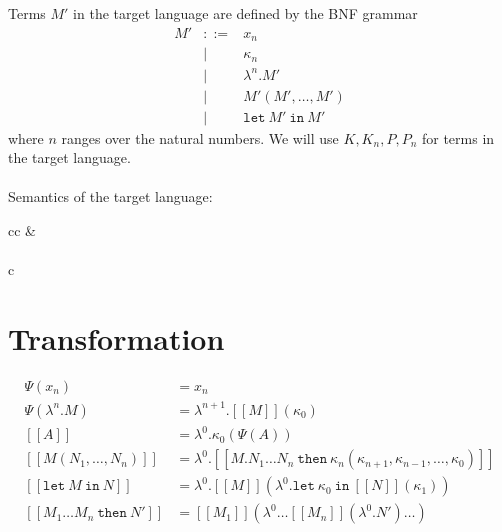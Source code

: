 \documentclass[a4paper,11pt]{article}
\begin{document}
Terms $M'$ in the target language are defined by the BNF grammar
\begin{eqnarray*}
M' & ::= & x_{n} \\
   &   | & \kappa_{n} \\
   &   | & \lambda^{n}.M' \\
   &   | & M'(M', \ldots, M') \\
   &   | & \texttt{let} \: M' \: \texttt{in} \: M'
\end{eqnarray*}
where $n$ ranges over the natural numbers.
We will use $K, K_{n}, P, P_{n}$ for terms in the target language.

\paragraph{}

Semantics of the target language:

\begin{center}

\begin{tabular}{cc}
 &
 \\
\end{tabular}

\paragraph{}

\begin{tabular}{c}
\end{tabular}

\end{center}


\section{Transformation}\label{sec:transformation}

\begin{align*}
\Psi(x_{n}) &=
  x_{n} \\
\Psi(\lambda^{n}.M) &=
  \lambda^{n+1}.[\![M]\!](\kappa_{0}) \\[1em]
[\![A]\!] &=
  \lambda^{0}.\kappa_{0} (\Psi(A)) \\
[\![M(N_{1}, \ldots, N_{n})]\!] &=
  \lambda^{0}.[\![M . N_{1} \ldots N_{n} \: \texttt{then} \:
  \kappa_{n}(\kappa_{n+1}, \kappa_{n-1}, \ldots, \kappa_{0})]\!] \\
[\![\texttt{let} \: M \: \texttt{in} \: N]\!] &=
  \lambda^{0}.[\![M]\!] (\lambda^{0}.\texttt{let} \:
  \kappa_{0} \: \texttt{in} \: [\![N]\!] (\kappa_{1})) \\
[\![M_{1} \ldots M_{n} \: \texttt{then} \: N']\!] &=
  [\![M_{1}]\!] (\lambda^{0} \ldots [\![M_{n}]\!] (\lambda^{0}.N') \ldots )
\end{align*}
\end{document}
